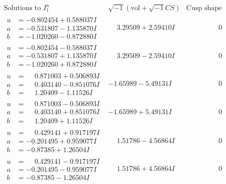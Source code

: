 \documentclass[1p]{elsarticle_modified}
\theoremstyle{definition}
\newcommand{\I}{\sqrt{-1}}
\begin{document}
$$\begin{array}{c|c|c}  
\text{Solutions to }I^u_{1}& \I (\text{vol} + \sqrt{-1}CS) & \text{Cusp shape}\\
 \hline 
\begin{aligned}
u &= -0.802454 + 0.588037 I \\
a &= -0.531807 - 1.135870 I \\
b &= -1.020260 - 0.872880 I\end{aligned}
 & \phantom{-}3.29509 + 2.59410 I & \phantom{-0.000000 } 0 \\ \hline\begin{aligned}
u &= -0.802454 - 0.588037 I \\
a &= -0.531807 + 1.135870 I \\
b &= -1.020260 + 0.872880 I\end{aligned}
 & \phantom{-}3.29509 - 2.59410 I & \phantom{-0.000000 } 0 \\ \hline\begin{aligned}
u &= \phantom{-}0.871003 + 0.506893 I \\
a &= \phantom{-}0.403140 - 0.851076 I \\
b &= \phantom{-}1.20409 - 1.11526 I\end{aligned}
 & -1.65989 - 5.49131 I & \phantom{-0.000000 } 0 \\ \hline\begin{aligned}
u &= \phantom{-}0.871003 - 0.506893 I \\
a &= \phantom{-}0.403140 + 0.851076 I \\
b &= \phantom{-}1.20409 + 1.11526 I\end{aligned}
 & -1.65989 + 5.49131 I & \phantom{-0.000000 } 0 \\ \hline\begin{aligned}
u &= \phantom{-}0.429141 + 0.917197 I \\
a &= -0.201495 + 0.959077 I \\
b &= -0.87385 + 1.26504 I\end{aligned}
 & \phantom{-}1.51786 - 4.56864 I & \phantom{-0.000000 } 0 \\ \hline\begin{aligned}
u &= \phantom{-}0.429141 - 0.917197 I \\
a &= -0.201495 - 0.959077 I \\
b &= -0.87385 - 1.26504 I\end{aligned}
 & \phantom{-}1.51786 + 4.56864 I & \phantom{-0.000000 } 0 \\ \hline\begin{aligned}

\end{aligned}
\end{array}$$
\end{document}
